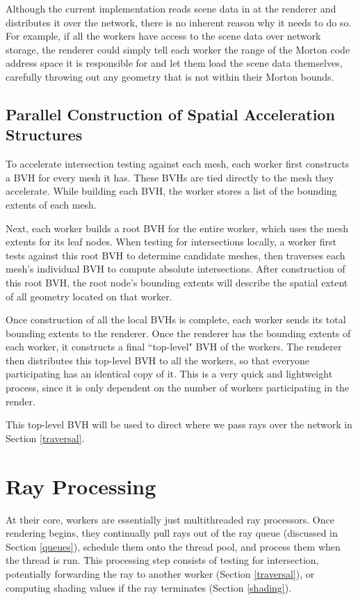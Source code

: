 \documentclass[12pt]{ucthesis}
\begin{document}
Although the current implementation reads scene data in at the renderer
and distributes it over the network, there is no inherent reason why it needs to
do so. For example, if all the workers have access to the scene data over network
storage, the renderer could simply tell each worker the range of the Morton code
address space it is responsible for and let them load the scene data themselves,
carefully throwing out any geometry that is not within their Morton bounds.

\subsection{Parallel Construction of Spatial Acceleration Structures}
\label{parallelbvh}

To accelerate intersection testing against each mesh, each worker first
constructs a BVH for every mesh it has. These BVHs are tied directly to the mesh
they accelerate. While building each BVH, the worker stores a list of the bounding
extents of each mesh.

Next, each worker builds a root BVH for the entire worker, which uses the mesh
extents for its leaf nodes. When testing for intersections locally, a worker
first tests against this root BVH to determine candidate meshes, then traverses
each mesh's individual BVH to compute absolute intersections. After construction
of this root BVH, the root node's bounding extents will describe the spatial
extent of all geometry located on that worker.

Once construction of all the local BVHs is complete, each worker sends its
total bounding extents to the renderer. Once the renderer has the bounding
extents of each worker, it constructs a final ``top-level" BVH of the workers.
The renderer then distributes this top-level BVH to all the workers, so that
everyone participating has an identical copy of it. This is a very quick and
lightweight process, since it is only dependent on the number of workers
participating in the render.

This top-level BVH will be used to direct where we pass rays over the network
in Section \ref{traversal}.

\section{Ray Processing}
\label{process}

At their core, workers are essentially just multithreaded ray processors. Once
rendering begins, they continually pull rays out of the ray queue (discussed in
Section \ref{queues}), schedule them onto the thread pool, and process them
when the thread is run. This processing step consists of testing for intersection,
potentially forwarding the ray to another worker (Section \ref{traversal}),
or computing shading values if the ray terminates (Section \ref{shading}).
\end{document}
